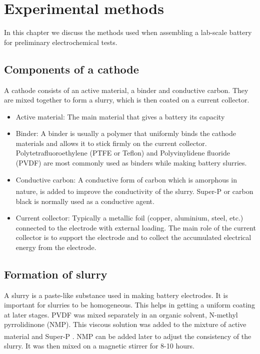 
\chapter{Experimental methods} %
In this chapter we discuss the methods used when assembling a lab-scale battery for preliminary electrochemical tests. 
\label{chap3} %

\section{Components of a cathode}
A cathode consists of an active material, a binder and conductive carbon. They are mixed together to form a slurry, which is then coated on a current collector.  
\begin{itemize}
    \item Active material: The main material that gives a battery its capacity
    \item Binder: A binder is usually a polymer that uniformly binds the cathode materials and allows it to stick firmly on the current collector. Polytetrafluoroethylene (PTFE or Teflon) and Polyvinylidene fluoride (PVDF) are most commonly used as binders while making battery slurries.
    \item Conductive carbon: A conductive form of carbon which is amorphous in nature, is added to improve the conductivity of the slurry. Super-P\textsuperscript{\textregistered} or carbon black is normally used as a conductive agent. 
    \item Current collector: Typically a metallic foil (copper, aluminium, steel, etc.) connected to the electrode with external loading. The main role of the current collector is to support the electrode and to collect the accumulated electrical energy from the electrode\cite{sun_effect_2017}.
\end{itemize}
\section{Formation of slurry}
A slurry is a paste-like substance used in making battery electrodes. It is important for slurries to be homogeneous. This helps in getting a uniform coating at later stages.  PVDF was mixed separately in an organic solvent, N-methyl pyrrolidinone (NMP). This viscous solution was added to the mixture of active material and Super-P\textsuperscript{\textregistered} . NMP can be added later to adjust the consistency of the slurry. It was then mixed on a magnetic stirrer for 8-10 hours. 
